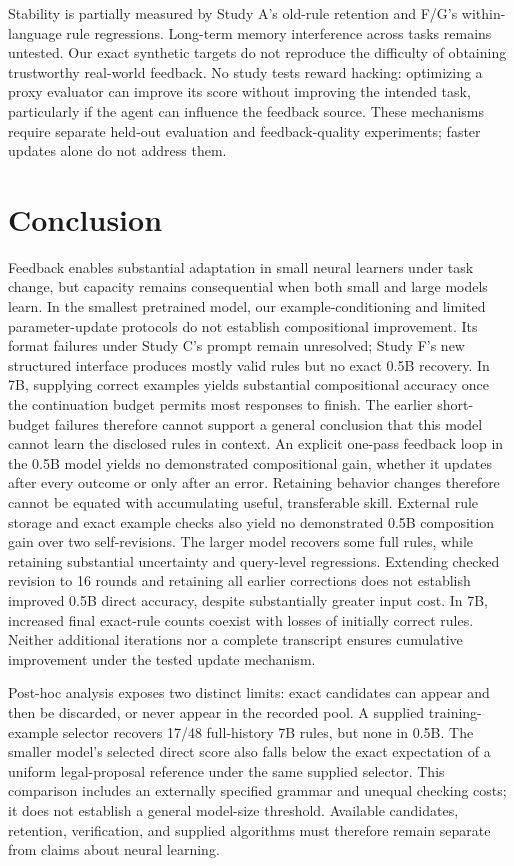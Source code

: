 \documentclass[11pt]{article}
\begin{document}
Stability is partially measured by Study A's old-rule retention and F/G's
within-language rule regressions. Long-term memory interference across tasks
remains untested. Our exact
synthetic targets do not reproduce the difficulty of obtaining trustworthy
real-world feedback. No study tests reward hacking: optimizing a proxy evaluator
can improve its score without improving the intended task, particularly if the
agent can influence the feedback source. These mechanisms require separate
held-out evaluation and feedback-quality experiments; faster updates alone do
not address them.

\section{Conclusion}
Feedback enables substantial adaptation in small neural learners under task
change, but capacity remains consequential when both small and large models
learn. In the smallest pretrained model, our example-conditioning and limited
parameter-update protocols do not establish compositional improvement. Its
format failures under Study C's prompt remain unresolved; Study F's new
structured interface produces mostly valid rules but no exact 0.5B recovery.
In 7B, supplying correct examples yields
substantial compositional accuracy once the continuation budget permits most
responses to finish. The earlier short-budget failures therefore cannot support
a general conclusion that this model cannot learn the disclosed rules in context.
An explicit one-pass feedback loop in the 0.5B model yields no demonstrated
compositional gain, whether it updates after every outcome or only after an
error. Retaining behavior changes therefore cannot be equated with accumulating
useful, transferable skill. External rule storage and exact example checks
also yield no demonstrated 0.5B composition gain over two self-revisions.
The larger model recovers some full rules, while retaining substantial
uncertainty and query-level regressions. Extending checked revision to 16
rounds and retaining all earlier corrections does not establish improved
0.5B direct accuracy, despite substantially greater input cost. In 7B,
increased final exact-rule counts coexist with losses of initially correct
rules. Neither additional iterations nor a complete transcript ensures
cumulative improvement under the tested update mechanism.

Post-hoc analysis exposes two distinct limits: exact candidates can appear
and then be discarded, or never appear in the recorded pool. A supplied
training-example selector recovers 17/48 full-history 7B rules, but none in
0.5B. The smaller model's selected direct score also falls below the exact
expectation of a uniform legal-proposal reference under the same supplied
selector. This comparison includes an externally specified grammar and
unequal checking costs; it does not establish a general model-size threshold.
Available candidates, retention, verification, and supplied algorithms must
therefore remain separate from claims about neural learning.
\end{document}
